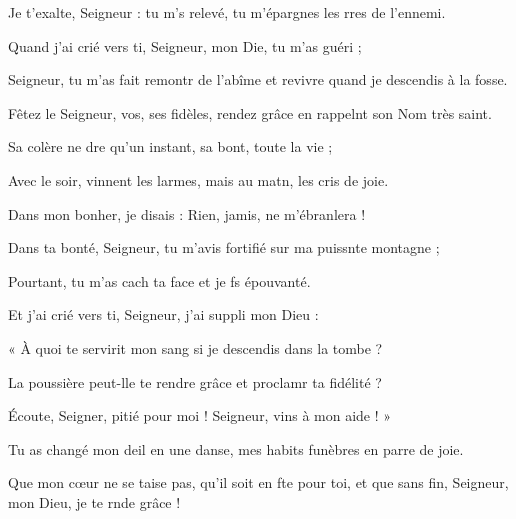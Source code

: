 \item Je t’exalte, Seigneur : tu m’s relevé,\psstar{} tu m’épargnes les rres de l’ennemi.
\item Quand j’ai crié vers ti, Seigneur,\psstar{} mon Die, tu m’as guéri ;
\item Seigneur, tu m’as fait remontr de l’abîme\psstar{} et revivre quand je descendis à la fosse.
\item Fêtez le Seigneur, vos, ses fidèles,\psstar{} rendez grâce en rappelnt son Nom très saint.
\item Sa colère ne dre qu’un instant,\psstar{} sa bont, toute la vie ;
\item Avec le soir, vinnent les larmes,\psstar{} mais au matn, les cris de joie.
\item Dans mon bonher, je disais :\psstar{} Rien, jamis, ne m’ébranlera !
\item Dans ta bonté, Seigneur, tu m’avis fortifié\psstar{} sur ma puissnte montagne ; 
\item Pourtant, tu m’as cach ta face\psstar{} et je fs épouvanté.
\item Et j’ai crié vers ti, Seigneur,\psstar{} j’ai suppli mon Dieu :
\item « À quoi te servirit mon sang\psstar{} si je descendis dans la tombe ?
\item La poussière peut-lle te rendre grâce\psstar{} et proclamr ta fidélité ?
\item Écoute, Seigner, pitié pour moi !\psstar{} Seigneur, vins à mon aide ! »
\item Tu as changé mon deil en une danse,\psstar{} mes habits funèbres en parre de joie.
\item Que mon cœur ne se taise pas, qu’il soit en fte pour toi,\psstar{} et que sans fin, Seigneur, mon Dieu, je te rnde grâce !